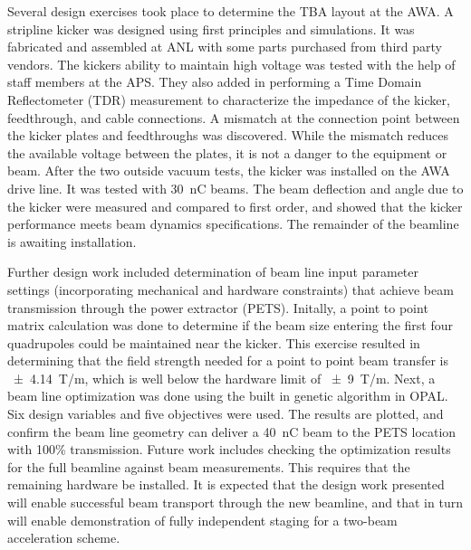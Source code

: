 
Several design exercises took place to determine the TBA layout at the AWA. 
A stripline kicker was designed using first principles and simulations. 
It was fabricated and assembled at ANL with some parts purchased from third party vendors.
The kickers ability to maintain high voltage was tested with the help of staff members at the APS.
They also added in performing a Time Domain Reflectometer (TDR) measurement to characterize 
the impedance of the kicker, feedthrough, and cable connections. 
A mismatch at the connection point between the kicker plates and feedthroughs was discovered.
While the mismatch reduces the available voltage between the plates, it is not a danger to 
the equipment or beam. After the two outside vacuum tests, the kicker was installed on 
the AWA drive line. It was tested with \SI{30}{nC} beams. 
The beam deflection and angle due to the kicker were measured and 
compared to first order, and showed that the kicker performance meets beam dynamics specifications. 
The remainder of the beamline is awaiting installation. 

Further design work included determination of beam line input parameter settings (incorporating 
mechanical and hardware constraints) that achieve beam transmission through the power extractor (PETS).
Initally, a point to point matrix calculation was done to determine if the 
beam size entering the first four quadrupoles could be maintained near the kicker.
This exercise resulted in determining that the field strength needed for a point to point beam transfer is \SI{\pm 4.14}{T/m}, 
which is well below the hardware limit of \SI{\pm9}{T/m}. 
Next, a beam line optimization was done using the built in genetic algorithm in OPAL.  
Six design variables and five objectives were used. 
The results are plotted, and confirm the beam line geometry can deliver 
a \SI{40}{nC} beam to the PETS location with 100\% transmission.
Future work includes checking the optimization results for the full beamline against beam measurements.  
This requires that the remaining hardware be installed.  
It is expected that the design work presented will enable successful beam transport through the new beamline, 
and that in turn will enable demonstration of fully independent staging for a two-beam acceleration scheme. 

 












